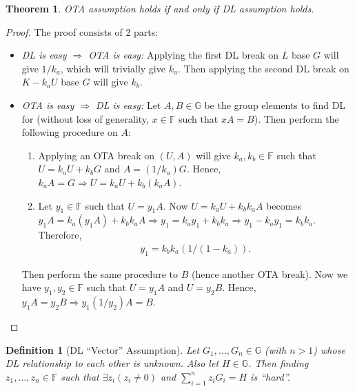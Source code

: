 \documentclass{article}
\newtheorem{definition}{Definition}[section]
\newtheorem{theorem}{Theorem}[section]
\begin{document}
\begin{theorem}
OTA assumption holds if and only if DL assumption holds.
\end{theorem}
\begin{proof}
The proof consists of 2 parts:
    \begin{itemize}
    \item \textit{DL is easy $\Rightarrow$ OTA is easy:} Applying the first DL break on $L$ base $G$ will give $1/k_a$, which will trivially give $k_a$. Then applying the second DL break on $K - k_a U$ base $G$ will give $k_b$.
    \item \textit{OTA is easy $\Rightarrow$ DL is easy:} Let $A, B\in\mathbb{G}$ be the group elements to find DL for (without loss of generality, $x\in\mathbb{F}$ such that $xA=B$). Then perform the following procedure on $A$:
        \begin{enumerate}
        \item Applying an OTA break on $(U, A)$ will give $k_a, k_b\in\mathbb{F}$ such that $U = k_a U + k_b G$ and $A = (1/k_a)G$. Hence, $k_a A = G \Rightarrow U = k_a U + k_b (k_a A)$.
        \item Let $y_1\in\mathbb{F}$ such that $U=y_1 A$. Now $U = k_a U + k_b k_a A$ becomes $y_1 A = k_a (y_1 A) + k_b k_a A \Rightarrow y_1 = k_a y_1 + k_b k_a \Rightarrow y_1 - k_a y_1 = k_b k_a$. Therefore,
        \begin{align*}
            y_1 = k_b k_a (1/(1 - k_a)).
        \end{align*}
        \end{enumerate}
Then perform the same procedure to $B$ (hence another OTA break). Now we have $y_1, y_2\in\mathbb{F}$ such that $U=y_1 A$ and $U=y_2 B$. Hence, $y_1 A = y_2 B \Rightarrow  y_1(1/y_2) A = B$.
    \end{itemize}
\end{proof}

\begin{definition}[DL ``Vector'' Assumption]
Let $G_1,\ldots,G_n\in\mathbb{G}$ (with $n>1$) whose DL relationship to each other is unknown. Also let $H\in\mathbb{G}$. Then finding $z_1,\ldots,z_n\in\mathbb{F}$ such that $\exists z_i(z_i \neq 0)$ and $\sum_{i=1}^{n}{z_i G_i}=H$ is ``hard''.
\end{definition}
\end{document}
